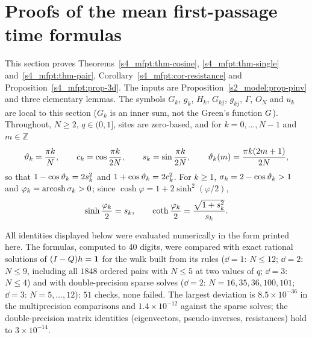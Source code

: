 \section{Proofs of the mean first-passage time formulas}\label{appA_proofs:sec}

This section proves Theorems~\ref{s4_mfpt:thm-cosine}, \ref{s4_mfpt:thm-single} and~\ref{s4_mfpt:thm-pair},
Corollary~\ref{s4_mfpt:cor-resistance} and Proposition~\ref{s4_mfpt:prop-3d}. The inputs are
Proposition~\ref{s2_model:prop-pinv} and three elementary lemmas. The symbols $G_k$, $g_k$, $H_k$, $G_{kj}$,
$g_{kj}$, $\Gamma$, $O_N$ and $u_k$ are local to this section ($G_k$ is an inner sum, not the Green's function
$G$). Throughout, $N\ge2$, $q\in(0,1]$, sites are
zero-based, and for $k=0,\dots,N-1$ and $m\in\mathbb Z$
\[
  \vartheta_{k}=\frac{\pi k}{N},\qquad c_{k}=\cos\frac{\pi k}{2N},\qquad s_{k}=\sin\frac{\pi k}{2N},\qquad
  \vartheta_{k}(m)=\frac{\pi k(2m+1)}{2N},
\]
so that $1-\cos\vartheta_{k}=2s_{k}^{2}$ and $1+\cos\vartheta_{k}=2c_{k}^{2}$. For $k\ge1$, $\sigma_{k}=2-\cos\vartheta_{k}>1$ and
$\varphi_{k}=\operatorname{arcosh}\sigma_{k}>0$; since $\cosh\varphi=1+2\sinh^{2}(\varphi/2)$,
\begin{equation}\label{appA_proofs:eq-half-angle}
  \sinh\frac{\varphi_{k}}{2}=s_{k},\qquad \coth\frac{\varphi_{k}}{2}=\frac{\sqrt{1+s_{k}^{2}}}{s_{k}} .
\end{equation}

All identities displayed below were evaluated numerically in the form printed here. The formulas, computed to
$40$ digits, were compared with exact rational solutions of $(I-Q)h=\mathbf{1}$ for the walk built from its rules
($\dd=1$: $N\le12$; $\dd=2$: $N\le9$, including all $1848$ ordered pairs with $N\le5$ at two values of $q$;
$\dd=3$: $N\le4$) and with double-precision sparse solves ($\dd=2$: $N=16,35,36,100,101$; $\dd=3$: $N=5,\dots,12$):
$51$ checks, none failed. The largest deviation is $8.5\times10^{-36}$ in the multiprecision comparisons and
$1.4\times10^{-12}$ against the sparse solves; the double-precision matrix identities (eigenvectors,
pseudo-inverses, resistances) hold to $3\times10^{-14}$.

